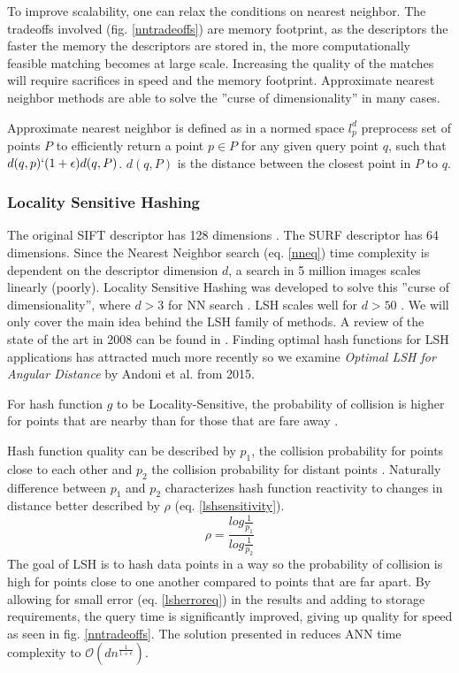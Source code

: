 \documentclass[english,12pt,a4paper,pdftex,elec,utf8, table]{aaltothesis}
\begin{document}
To improve scalability, one can relax the conditions on nearest neighbor. The tradeoffs involved (fig. \ref{nntradeoffs}) are memory footprint, as the descriptors the faster the memory the descriptors are stored in, the more computationally feasible matching becomes at large scale. Increasing the quality of the matches will require sacrifices in speed and the memory footprint. Approximate nearest neighbor methods are able to solve the ''curse of dimensionality'' in many cases.

Approximate nearest neighbor is defined as in a normed space $l_p^d$ preprocess set of points $P$ to efficiently return a point $p\in P$ for any given query point $q$, such that $d(q,p) \lq (1 + \epsilon)d(q,P)$. $d(q, P)$ is the distance between the closest point in $P$ to $q$. \cite{Gionis1999}

\subsubsection{Locality Sensitive Hashing}
The original SIFT descriptor has 128 dimensions \cite{Lowe1999}.  The SURF descriptor has 64 dimensions. Since the Nearest Neighbor search (eq. \ref{nneq}) time complexity is dependent on the descriptor dimension $d$, a search in 5 million images scales linearly (poorly). Locality Sensitive Hashing was developed to solve this ''curse of dimensionality'', where $d > 3$ for NN search \cite{Gionis1999}. LSH scales well for $d > 50$ \cite{Gionis1999}. We will only cover the main idea behind the LSH family of methods. A review of the state of the art in 2008 can be found in \cite{Andoni2008}. Finding optimal hash functions for LSH applications has attracted much more recently so we examine \emph{Optimal LSH for Angular Distance} \cite{Andoni2015} by Andoni et al. from 2015.

For hash function $g$ to be Locality-Sensitive, the probability of collision is higher for points that are nearby than for those that are fare away \cite{Andoni2015}.

Hash function quality can be described by $p_1$, the collision probability for points close to each other and $p_2$ the collision probability for distant points \cite{Andoni2015}. Naturally difference between $p_1$ and $p_2$ characterizes hash function reactivity to changes in distance better described by $\rho$ (eq. \ref{lshsensitivity}).
\begin{equation}
  \label{lshsensitivity}
  \rho = \frac{log\frac{1}{p_1}}{log\frac{1}{p_2}}
  \end{equation}
The goal of LSH is to hash data points in a way so the probability of collision is high for points close to one another compared to points that are far apart. By allowing for small error (eq. \ref{lsherroreq}) in the results and adding to storage requirements, the query time is significantly improved, giving up quality for speed as seen in fig. \ref{nntradeoffs}. \cite{Gionis1999} The solution presented in \cite{Gionis1999} reduces ANN time complexity to $\mathcal{O}(dn^{\frac{1}{1+\epsilon}})$.
\end{document}
